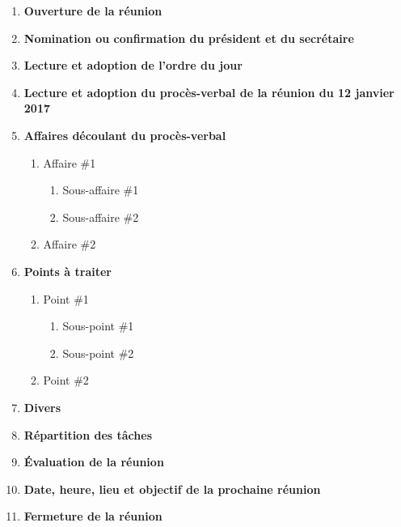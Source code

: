 \documentclass[12pt]{ULojpv}
\begin{document}
\entete
\begin{enumerate}
   \item \textbf{Ouverture de la réunion}
   \item \textbf{Nomination ou confirmation du président et du secrétaire}
   \item \textbf{Lecture et adoption de l'ordre du jour}
   \item \textbf{Lecture et adoption du procès-verbal de la réunion du 12 janvier 2017}
   \item \textbf{Affaires découlant du procès-verbal}
      \begin{enumerate}
         \item Affaire \#1
            \begin{enumerate}
               \item Sous-affaire \#1
               \item Sous-affaire \#2
            \end{enumerate}
         \item Affaire \#2
      \end{enumerate}
   \item \textbf{Points à traiter}
      \begin{enumerate}
         \item Point \#1
            \begin{enumerate}
               \item Sous-point \#1
               \item Sous-point \#2
            \end{enumerate}
         \item Point \#2
      \end{enumerate}
   \item \textbf{Divers}
   \item \textbf{Répartition des tâches}
   \item \textbf{Évaluation de la réunion}
   \item \textbf{Date, heure, lieu et objectif de la prochaine réunion}
   \item \textbf{Fermeture de la réunion}
\end{enumerate}
\end{document}
